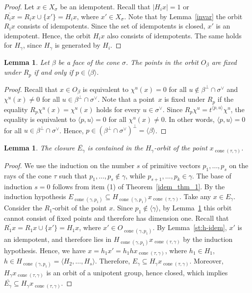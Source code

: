 \documentclass[a4paper, 11pt]{amsart}
\theoremstyle{plain}
\newtheorem{lemma}[theorem]{Lemma}
\theoremstyle{remark}
\theoremstyle{definition}
\newcommand{\ol}[1]{\overline{#1}}
\DeclareMathOperator{\cone}{cone}
\begin{document}
\begin{proof} Let $x \in X_\sigma$ be an idempotent. Recall that $|H_i x| = 1$ or $\ol{R_i x} = R_i x \cup \{x'\} = H_i x$, where $x' \in X_\sigma$. Note that by Lemma~\ref{invar} the orbit $ R_i x$ consists of idempotents. Since the set of idempotents is closed, $x'$ is an idempotent. Hence, the orbit $H_i x$ also consists of idempotents. The same holds for $H_\gamma$, since $H_\gamma$ is generated by $H_i$.
\end{proof}

\begin{lemma}\label{st:st}
Let $\beta$ be a face of the cone $\sigma$. The points in the orbit $O_\beta$ are fixed under $R_p$ if and only if $p \in \langle\beta \rangle$.
\end{lemma}

\begin{proof} Recall that $x \in O_\beta$ is equivalent to $\chi^u(x) = 0$ for all $u \notin \beta^\perp \cap \sigma^\vee$ and $\chi^u(x) \neq 0$ for all $u \in \beta^\perp \cap \sigma^\vee$. Note that a point~$x$ is fixed under $R_p$ if the equality $R_p \chi^u(x)  = \chi^u(x)$ holds for every $u \in \sigma^\vee$. Since $R_p \chi^u = t^{\langle p, u \rangle} \chi^u$, the equality is equivalent to $\langle p, u \rangle = 0$ for all $\chi^u(x) \neq 0$. In other words, $\langle p, u \rangle = 0$ for all $u \in \beta^\perp \cap \sigma^\vee$. Hence, $p \in \left(  \beta^\perp \cap \sigma^\vee \right)^\perp = \langle \beta \rangle$.
\end{proof}

\begin{lemma}\label{st:cl_gam}
The closure $\ol{E_\gamma}$ is contained in the $H_\gamma$-orbit of the point $x_{\cone(\tau, \gamma)}$.
\end{lemma}

\begin{proof} We use the induction on the number $s$ of primitive vectors $p_1, \ldots, p_s$ on the rays of the cone $\tau$ such that $p_1, \ldots, p_s \notin \gamma$, while $p_{s+1}, \ldots, p_k\in \gamma$. The base of induction $s = 0$ follows from item (1) of Theorem~\ref{idem_thm_1}. By the induction hypothesis $E_{\cone(\gamma, p_1)} \subseteq H_{\cone(\gamma, p_1)} x_{\cone(\tau, \gamma)}$. Take any $x \in E_\gamma$. Consider the $R_1$-orbit of the point $x$. Since $p_1 \notin \langle \gamma \rangle$, by Lemma~\ref{st:st} this orbit cannot consist of fixed points and therefore has dimension one. Recall that $\ol{R_1 x} = R_1 x \cup \{x'\} = H_1 x$, where $x' \in O_{\cone(\gamma, p_1)}$. By Lemma~\ref{st:h-idem}, $x'$ is an idempotent, and therefore lies in $H_{\cone(\gamma, p_1)} x_{\cone(\tau, \gamma)}$ by the induction hypothesis. Hence, we have $x = h_1 x' = h_1 h x_{\cone(\tau, \gamma)}$, where $h_1 \in H_1$, $h \in H_{\cone(\gamma, p_1)} = \langle H_2, \ldots, H_s \rangle$. Therefore, $E_\gamma \subseteq H_\gamma x_{\cone(\tau, \gamma)}$. Moreover, $H_\gamma x_{\cone(\tau, \gamma)}$ is an orbit of a unipotent group, hence closed, which implies $\ol{E_\gamma} \subseteq H_\gamma x_{\cone(\tau, \gamma)}$.
\end{proof}
\end{document}
